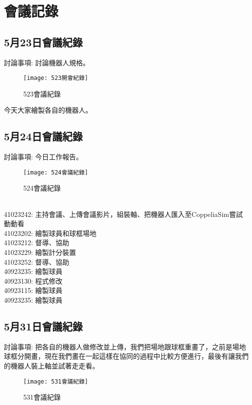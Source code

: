 \chapter{會議記錄}
\section{5月23日會議紀錄}
討論事項: 討論機器人規格。\\[6pt]
\begin{figure}[hbt!]
\begin{center}
\label{523會議紀錄}
\texttt{[image: 523開會紀錄]}
\caption{\Large 523會議紀錄}
\end{center}
\end{figure}
今天大家繪製各自的機器人。\\

\section{5月24日會議紀錄}
討論事項: 今日工作報告。\\
\begin{figure}[hbt!]
\begin{center}
\label{524會議紀錄}
\texttt{[image: 524會議紀錄]}
\caption{\Large 524會議紀錄}
\end{center}
\end{figure}\\

41023242: 主持會議、上傳會議影片，組裝軸、把機器人匯入至CoppeliaSim嘗試動動看\\

41023202: 繪製球員和球框場地\\

41023212: 督導、協助\\

41023229: 繪製計分裝置\\

41023252: 督導、協助\\

40923235: 繪製球員\\

40923130: 程式修改\\ 

40923115: 繪製球員\\ 

40923235: 繪製球員\\ 

\section{5月31日會議紀錄}
討論事項: 把各自的機器人做修改並上傳，我們把場地跟球框重畫了，之前是場地球框分開畫，現在我們畫在一起這樣在協同的過程中比較方便進行，最後有讓我們的機器人裝上軸並試著走走看。\\
\begin{figure}[hbt!]
\begin{center}
\label{531會議紀錄}
\texttt{[image: 531會議紀錄]}
\caption{\Large 531會議紀錄}
\end{center}
\end{figure}

\newpage
